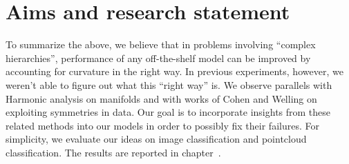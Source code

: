 \section{Aims and research statement} \label{sec:statement}

To summarize the above, we believe that in problems involving ``complex
hierarchies'', performance of any off-the-shelf model can be improved by
accounting for curvature in the right way. In previous experiments, however, we
weren't able to figure out what this ``right way'' is. We observe parallels
with Harmonic analysis on manifolds and with works of Cohen and Welling on
exploiting symmetries in data. Our goal is to incorporate insights from these
related methods into our models in order to possibly fix their failures.
For simplicity, we evaluate our ideas on image classification and pointcloud
classification.  The results are reported in chapter~.
